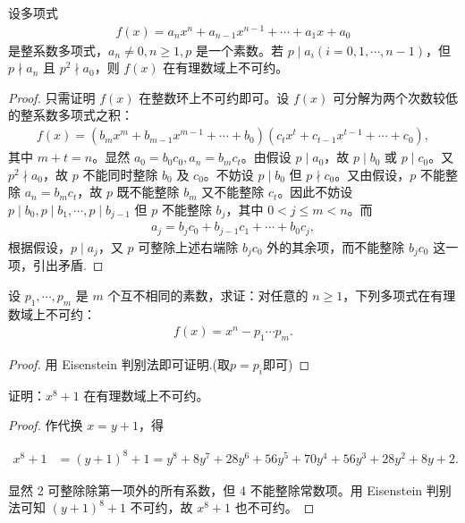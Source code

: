 \documentclass[../../main.tex]{subfiles}%
\begin{document}
\begin{theorem}\label{theorem:Eisenstein 判别法}
设多项式
\begin{align*}
f(x) = a_n x^n + a_{n-1} x^{n-1} + \cdots + a_1 x + a_0
\end{align*}
是整系数多项式，$a_n \neq 0, n \geqslant  1, p$ 是一个素数。若 $p \mid a_i (i = 0, 1, \cdots, n-1)$，但 $p \nmid a_n$ 且 $p^2 \nmid a_0$，则 $f(x)$ 在有理数域上不可约。    
\end{theorem}
\begin{proof}

只需证明 $f(x)$ 在整数环上不可约即可。设 $f(x)$ 可分解为两个次数较低的整系数多项式之积：
\begin{align*}
f(x) = (b_m x^m + b_{m-1} x^{m-1} + \cdots + b_0)(c_t x^t + c_{t-1} x^{t-1} + \cdots + c_0),
\end{align*}
其中 $m + t = n$。显然 $a_0 = b_0 c_0, a_n = b_m c_t$。由假设 $p \mid a_0$，故 $p \mid b_0$ 或 $p \mid c_0$。又 $p^2 \nmid a_0$，故 $p$ 不能同时整除 $b_0$ 及 $c_0$。不妨设 $p \mid b_0$ 但 $p \nmid c_0$。又由假设，$p$ 不能整除 $a_n = b_m c_t$，故 $p$ 既不能整除 $b_m$ 又不能整除 $c_t$。因此不妨设 $p \mid b_0, p \mid b_1, \cdots, p \mid b_{j-1}$ 但 $p$ 不能整除 $b_j$，其中 $0 < j \leqslant  m < n$。而
\begin{align*}
a_j = b_j c_0 + b_{j-1} c_1 + \cdots + b_0 c_j,
\end{align*}
根据假设，$p \mid a_j$，又 $p$ 可整除上述右端除 $b_j c_0$ 外的其余项，而不能整除 $b_j c_0$ 这一项，引出矛盾.

\end{proof}

\begin{example}
设 $p_1, \cdots, p_m$ 是 $m$ 个互不相同的素数，求证：对任意的 $n \geqslant  1$，下列多项式在有理数域上不可约：
\begin{align*}
f(x) = x^n - p_1 \cdots p_m.
\end{align*} 
\end{example}
\begin{proof}

用 Eisenstein 判别法即可证明.(取$p=p_i$即可)

\end{proof}

\begin{example}
证明：$x^8 + 1$ 在有理数域上不可约。
\end{example}
\begin{proof}

作代换 $x = y + 1$，得

\begin{align*}
x^8 + 1 &= (y + 1)^8 + 1 = y^8 + 8y^7 + 28y^6 + 56y^5 + 70y^4 + 56y^3 + 28y^2 + 8y + 2.
\end{align*}

显然 2 可整除除第一项外的所有系数，但 4 不能整除常数项。用 Eisenstein 判别法可知 $(y + 1)^8 + 1$ 不可约，故 $x^8 + 1$ 也不可约。

\end{proof}
\end{document}

